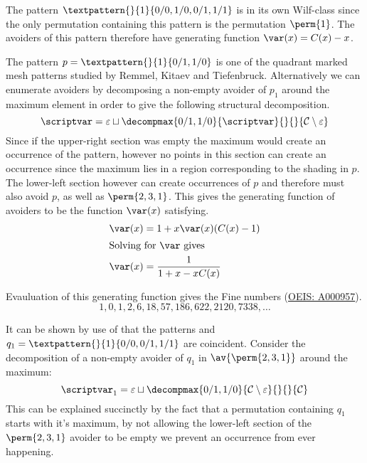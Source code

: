 The pattern \(\textpattern{}{1}{0/0,1/0,0/1,1/1}\) is in its own
Wilf-class since the only permutation containing this pattern is
the permutation \(\perm{1}\). The avoiders of this pattern therefore
have generating function \(\var(x) = C(x)-x\).

\nextvar
The pattern \(p = \textpattern{}{1}{0/1,1/0}\) is one of the
quadrant marked mesh patterns studied by Remmel,
Kitaev and Tiefenbruck\cite{2012arXiv1201.6243K}. Alternatively we can enumerate
avoiders by decomposing a non-empty avoider of \(p_1\) around the maximum element
in order to give the following structural decomposition.
\begin{equation*}
    \scriptvar = \varepsilon \sqcup \decompmax{0/1,1/0}{\scriptvar}{}{}{\mathcal{C}\setminus\varepsilon}
\end{equation*}
Since if the upper-right section was empty the maximum would create an
occurrence of the pattern, however no points in this section can create
an occurrence since the maximum lies in a region corresponding to the
shading in \(p\). The lower-left section however can create occurrences
of \(p\) and therefore must also avoid \(p\), as well as \(\perm{2,3,1}\).
This gives the generating function of avoiders to be the function \(\var(x)\)
satisfying.
\begin{align*}
    \var(x) &= 1 + x\var(x)(C(x)-1) \\
    \shortintertext{Solving for \(\var\) gives}
    \var(x) &= \frac{1}{1+x-xC(x)}
\end{align*}

Evauluation of this generating function gives the Fine numbers
(\href{https://oeis.org/A000957}{OEIS: A000957}).
\begin{equation*}
    1, 0, 1, 2, 6, 18, 57, 186, 622, 2120, 7338,\dotsc
\end{equation*}


\nextvar[\varfine]
It can be shown by use of  that the patterns
 and \(q_1 = \textpattern{}{1}{0/0,0/1,1/1}\) are
coincident. Consider the decomposition of a non-empty avoider of \(q_1\) in
\(\av{\perm{2,3,1}}\) around the maximum:
\begin{equation*}
    \scriptvar_1 =\varepsilon \sqcup \decompmax{0/1,1/0}{\mathcal{C}\setminus\varepsilon}{}{}{\mathcal{C}}
\end{equation*}
This can be explained succinctly by the fact that a permutation containing
\(q_1\) starts with it's maximum, by not allowing the lower-left section of the
\(\perm{2,3,1}\) avoider to be empty we prevent an occurrence from ever happening.

